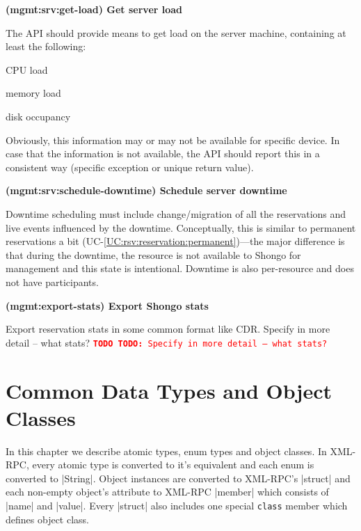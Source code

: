 \documentclass[a4paper]{report}
\makeatletter
\newcommand{\ApiValue}[1]{\verb|#1|}
\newcounter{UCcounter}
\newenvironment{UseCases}%
	{\begin{list}{\textbf{UC-\arabic{UCcounter}}}{\@nmbrlisttrue\def\@listctr{UCcounter}}}%
	{\end{list}}
\newcommand{\UClabel}[1]{\label{UC:#1}}
\newcommand{\UCref}[1]{UC-\ref{UC:#1}}
\newcommand{\UseCase}[2]{\item\UClabel{#2} \textbf{(#2) #1}\\ \nopagebreak}
\newcommand{\TODO}[1]{%
\def\empty{}%
\def\prvniparametr{#1}%
\ifx\prvniparametr\empty%
\begingroup\tt\textcolor{red}{\noindent\textbf{TODO}}\endgroup
\else%
\begingroup\tt\textcolor{red}{\noindent\textbf{TODO:}\ #1}\endgroup
\fi%
}
\makeatother
\begin{document}
\begin{UseCases}

\UseCase{Get server load}{mgmt:srv:get-load}

The API should provide means to get load on the server machine, containing at
least the following:

\begin{compactitem}

\item CPU load

\item memory load

\item disk occupancy

\end{compactitem}

Obviously, this information may or may not be available for specific device.
In case that the information is not available, the API should report this in a
consistent way (specific exception or unique return value).


\UseCase{Schedule server downtime}{mgmt:srv:schedule-downtime}

Downtime scheduling must include change/migration of all the reservations and
live events influenced by the downtime. Conceptually, this is similar to
permanent reservations a bit (\UCref{rsv:reservation:permanent})---the major
difference is that during the downtime, the resource is not available to Shongo
for management and this state is intentional. Downtime is also per-resource and
does not have participants.

\UseCase{Export Shongo stats}{mgmt:export-stats}

Export reservation stats in some common format like CDR.
\TODO{Specify in more detail -- what stats?}

\end{UseCases}




\chapter{Common Data Types and Object Classes}

In this chapter we describe atomic types, enum types and object classes. In XML-RPC, every atomic type is converted to it's equivalent and each enum is converted to |String|. Object instances are converted to XML-RPC's |struct| and each non-empty object's attribute to XML-RPC |member| which consists of |name| and |value|. Every |struct| also includes one special \ApiValue{class} member which defines object class.
\end{document}
